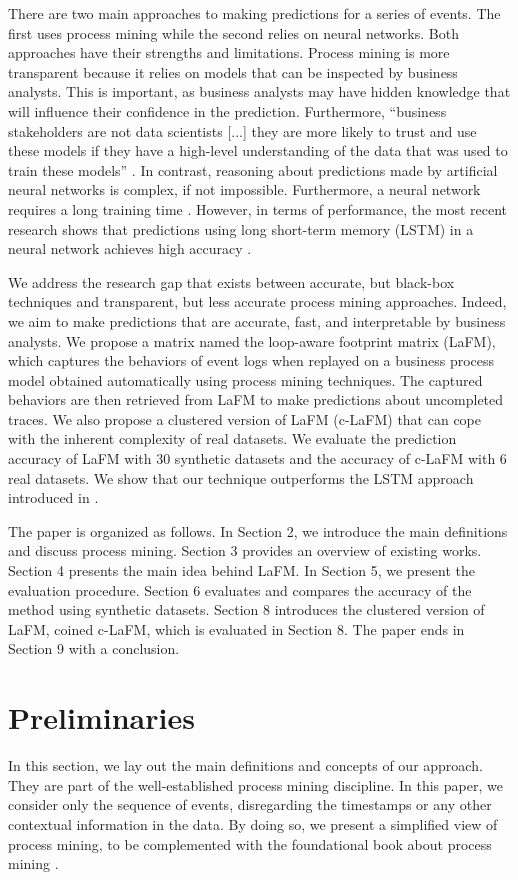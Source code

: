 \documentclass[runningheads]{llncs}
\begin{document}
There are two main approaches to making predictions for a series of events. The first uses process mining while the second relies on neural networks. Both approaches have their strengths and limitations. Process mining is more transparent because it relies on models that can be inspected by business analysts. This is important, as business analysts may have hidden knowledge that will influence their confidence in the prediction. Furthermore, ``business stakeholders are not data scientists [...] they are more likely to trust and use these models if they have a high-level understanding of the data that was used to train these models'' \cite{Gartner2018ExplainableAI}. In contrast, reasoning about predictions made by artificial neural networks is complex, if not impossible. Furthermore, a neural network requires a long training time \cite{polato2018time}. However, in terms of performance, the most recent research shows that predictions using long short-term memory (LSTM) in a neural network achieves high accuracy \cite{tax2017predictive}.

We address the research gap that exists between accurate, but black-box techniques and transparent, but less accurate process mining approaches. Indeed, we aim to make predictions that are accurate, fast, and interpretable by business analysts. We propose a matrix named the loop-aware footprint matrix (LaFM), which captures the behaviors of event logs when replayed on a business process model obtained automatically using process mining techniques. The captured behaviors are then retrieved from LaFM to make predictions about uncompleted traces. We also propose a clustered version of LaFM (c-LaFM) that can cope with the inherent complexity of real datasets. We evaluate the prediction accuracy of LaFM with 30 synthetic datasets and the accuracy of c-LaFM with 6 real datasets. We show that our technique outperforms the LSTM approach introduced in \cite{tax2017predictive}.

The paper is organized as follows. In Section 2, we introduce the main definitions and discuss process mining. Section 3 provides an overview of existing works. Section 4 presents the main idea behind LaFM. In Section 5, we present the evaluation procedure. Section 6 evaluates and compares the accuracy of the method using synthetic datasets. Section 8 introduces the clustered version of LaFM, coined c-LaFM, which is evaluated in Section 8. The paper ends in Section 9 with a conclusion.

\section{Preliminaries}
In this section, we lay out the main definitions and concepts of our approach. They are part of the well-established process mining discipline. In this paper, we consider only the sequence of events, disregarding the timestamps or any other contextual information in the data. By doing so, we present a simplified view of process mining, to be complemented with the foundational book about process mining \cite{van2016process}.
\end{document}

